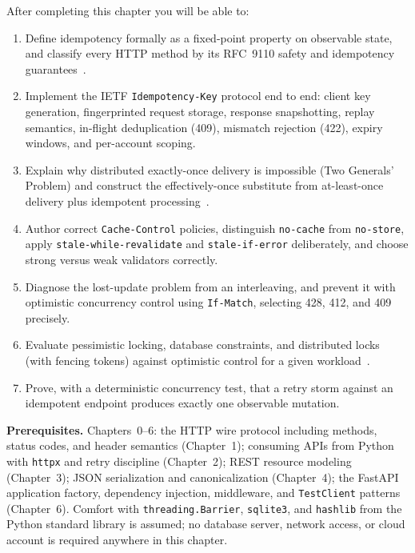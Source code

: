 After completing this chapter you will be able to:

\begin{enumerate}
  \item Define idempotency formally as a fixed-point property on observable
        state, and classify every HTTP method by its RFC~9110 safety and
        idempotency guarantees~\cite{rfc9110}.
  \item Implement the IETF \texttt{Idempotency-Key} protocol end to end:
        client key generation, fingerprinted request storage, response
        snapshotting, replay semantics, in-flight deduplication (409),
        mismatch rejection (422), expiry windows, and per-account scoping.
  \item Explain why distributed exactly-once delivery is impossible (Two
        Generals' Problem) and construct the effectively-once substitute
        from at-least-once delivery plus idempotent
        processing~\cite{kleppmann2017ddia}.
  \item Author correct \texttt{Cache-Control} policies, distinguish
        \texttt{no-cache} from \texttt{no-store}, apply
        \texttt{stale-while-revalidate} and \texttt{stale-if-error}
        deliberately, and choose strong versus weak validators correctly.
  \item Diagnose the lost-update problem from an interleaving, and prevent
        it with optimistic concurrency control using \texttt{If-Match},
        selecting 428, 412, and 409 precisely.
  \item Evaluate pessimistic locking, database constraints, and distributed
        locks (with fencing tokens) against optimistic control for a given
        workload~\cite{kleppmann2017ddia}.
  \item Prove, with a deterministic concurrency test, that a retry storm
        against an idempotent endpoint produces exactly one observable
        mutation.
\end{enumerate}

\textbf{Prerequisites.} Chapters~0--6: the HTTP wire protocol including
methods, status codes, and header semantics (Chapter~1); consuming APIs from
Python with \texttt{httpx} and retry discipline (Chapter~2); REST resource
modeling (Chapter~3); JSON serialization and canonicalization
(Chapter~4); the FastAPI application factory, dependency injection,
middleware, and \texttt{TestClient} patterns (Chapter~6). Comfort with
\texttt{threading.Barrier}, \texttt{sqlite3}, and \texttt{hashlib} from the
Python standard library is assumed; no database server, network access, or
cloud account is required anywhere in this chapter.

